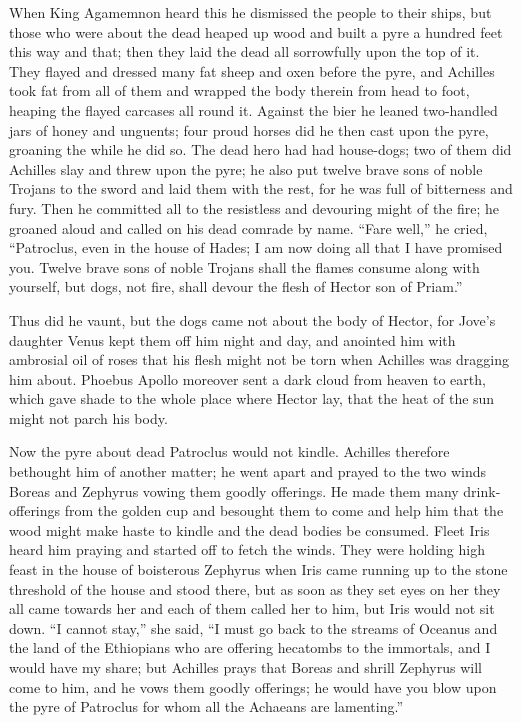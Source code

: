 When King Agamemnon heard this he dismissed the people to their ships, but
those who were about the dead heaped up wood and built a pyre a hundred
feet this way and that; then they laid the dead all sorrowfully upon the
top of it. They flayed and dressed many fat sheep and oxen before the
pyre, and Achilles took fat from all of them and wrapped the body therein
from head to foot, heaping the flayed carcases all round it. Against the
bier he leaned two-handled jars of honey and unguents; four proud horses
did he then cast upon the pyre, groaning the while he did so. The dead
hero had had house-dogs; two of them did Achilles slay and threw upon the
pyre; he also put twelve brave sons of noble Trojans to the sword and laid
them with the rest, for he was full of bitterness and fury. Then he
committed all to the resistless and devouring might of the fire; he
groaned aloud and called on his dead comrade by name. “Fare well,” he
cried, “Patroclus, even in the house of Hades; I am now doing all that I
have promised you. Twelve brave sons of noble Trojans shall the flames
consume along with yourself, but dogs, not fire, shall devour the flesh of
Hector son of Priam.”

Thus did he vaunt, but the dogs came not about the body of Hector, for
Jove’s daughter Venus kept them off him night and day, and anointed him
with ambrosial oil of roses that his flesh might not be torn when Achilles
was dragging him about. Phoebus Apollo moreover sent a dark cloud from
heaven to earth, which gave shade to the whole place where Hector lay,
that the heat of the sun might not parch his body.

Now the pyre about dead Patroclus would not kindle. Achilles therefore
bethought him of another matter; he went apart and prayed to the two winds
Boreas and Zephyrus vowing them goodly offerings. He made them many
drink-offerings from the golden cup and besought them to come and help him
that the wood might make haste to kindle and the dead bodies be consumed.
Fleet Iris heard him praying and started off to fetch the winds. They were
holding high feast in the house of boisterous Zephyrus when Iris came
running up to the stone threshold of the house and stood there, but as
soon as they set eyes on her they all came towards her and each of them
called her to him, but Iris would not sit down. “I cannot stay,” she said,
“I must go back to the streams of Oceanus and the land of the Ethiopians
who are offering hecatombs to the immortals, and I would have my share;
but Achilles prays that Boreas and shrill Zephyrus will come to him, and
he vows them goodly offerings; he would have you blow upon the pyre of
Patroclus for whom all the Achaeans are lamenting.”

